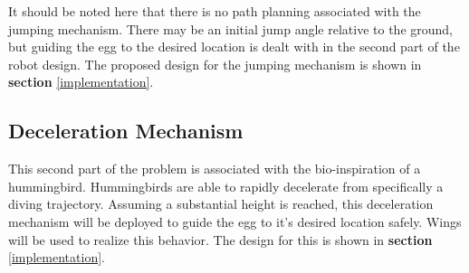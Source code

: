 \indent It should be noted here that there is no path planning associated with the jumping mechanism. There may be an initial jump angle relative to the ground, but guiding the egg to the desired location is dealt with in the second part of the robot design. The proposed design for the jumping mechanism is shown in \textbf{section} \ref{implementation}.\\

\subsection{Deceleration Mechanism}
\indent This second part of the problem is associated with the bio-inspiration of a hummingbird. Hummingbirds are able to rapidly decelerate from specifically a diving trajectory. Assuming a substantial height is reached, this deceleration mechanism will be deployed to guide the egg to it's desired location safely. Wings will be used to realize this behavior. The design for this is shown in \textbf{section} \ref{implementation}.\\ 

